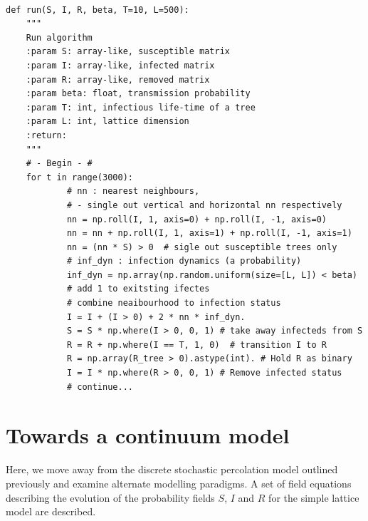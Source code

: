 \begin{lstlisting}[style=pythoncode,
    caption = An alorithm written in python to compute matrix equations and simulate disease spread. Code can be found in: \textcolor{red}{cite github repo?}.,
    label = py:rand]

def run(S, I, R, beta, T=10, L=500):
    """
    Run algorithm
    :param S: array-like, susceptible matrix
    :param I: array-like, infected matrix
    :param R: array-like, removed matrix
    :param beta: float, transmission probability
    :param T: int, infectious life-time of a tree
    :param L: int, lattice dimension
    :return:
    """
    # - Begin - #
    for t in range(3000):
            # nn : nearest neighbours, 
            # - single out vertical and horizontal nn respectively
            nn = np.roll(I, 1, axis=0) + np.roll(I, -1, axis=0)
            nn = nn + np.roll(I, 1, axis=1) + np.roll(I, -1, axis=1)
            nn = (nn * S) > 0  # sigle out susceptible trees only
            # inf_dyn : infection dynamics (a probability)
            inf_dyn = np.array(np.random.uniform(size=[L, L]) < beta)
            # add 1 to exitsting ifectes 
            # combine neaibourhood to infection status
            I = I + (I > 0) + 2 * nn * inf_dyn. 
            S = S * np.where(I > 0, 0, 1) # take away infecteds from S
            R = R + np.where(I == T, 1, 0)  # transition I to R
            R = np.array(R_tree > 0).astype(int). # Hold R as binary
            I = I * np.where(R > 0, 0, 1) # Remove infected status 
            # continue...
\end{lstlisting}


\section{Towards a continuum model}
\label{a:slm-mean-field-theory}

Here, we move away from the discrete stochastic percolation model outlined previously and examine alternate modelling paradigms. 
A set of field equations describing the evolution of the probability fields $S$, $I$ and $R$ for the simple lattice model are described.

